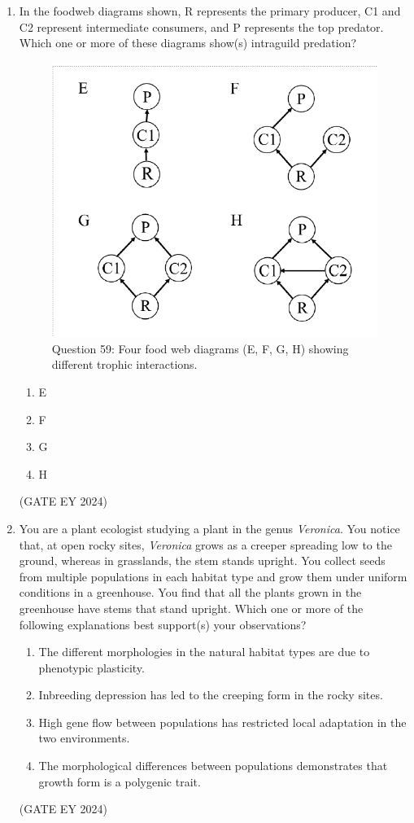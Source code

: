 \documentclass[journal]{IEEEtran}
\begin{document}
\begin{enumerate}
\item In the foodweb diagrams shown, R represents the primary producer, C1 and C2 represent intermediate consumers, and P represents the top predator. Which one or more of these diagrams show(s) intraguild predation?
\begin{figure}[!ht]
    \centering
    \includegraphics[width=0.3\columnwidth]{figs/Q-59.png}
    \caption{Question 59: Four food web diagrams (E, F, G, H) showing different trophic interactions.}
    \label{Q.59}
\end{figure}
    \begin{multicols}{2}
    \begin{enumerate}
        \item E
        \item F
        \item G
        \item H
    \end{enumerate}
    \end{multicols}
\hfill{(GATE EY 2024)}

\item You are a plant ecologist studying a plant in the genus \textit{Veronica}. You notice that, at open rocky sites, \textit{Veronica} grows as a creeper spreading low to the ground, whereas in grasslands, the stem stands upright. You collect seeds from multiple populations in each habitat type and grow them under uniform conditions in a greenhouse. You find that all the plants grown in the greenhouse have stems that stand upright. Which one or more of the following explanations best support(s) your observations?
    \begin{enumerate}
        \item The different morphologies in the natural habitat types are due to phenotypic plasticity.
        \item Inbreeding depression has led to the creeping form in the rocky sites.
        \item High gene flow between populations has restricted local adaptation in the two environments.
        \item The morphological differences between populations demonstrates that growth form is a polygenic trait.
    \end{enumerate}
\hfill{(GATE EY 2024)}


\end{enumerate}
\end{document}
